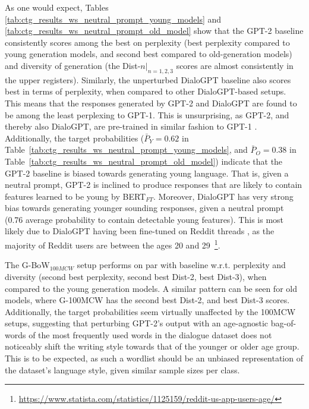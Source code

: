As one would expect, Tables \ref{tab:ctg_results_ws_neutral_prompt_young_models} and \ref{tab:ctg_results_ws_neutral_prompt_old_model} show that the GPT-2 baseline consistently scores among the best on perplexity (best perplexity compared to young generation models, and second best compared to old-generation models) and diversity of generation (the Dist-$n |_{n = 1,2,3}$ scores are almost consistently in the upper registers). Similarly, the unperturbed DialoGPT baseline also scores best in terms of perplexity, when compared to other DialoGPT-based setups. This means that the responses generated by GPT-2 and DialoGPT are found to be among the least perplexing to GPT-1. This is unsurprising, as GPT-2, and thereby also DialoGPT, are pre-trained in similar fashion to GPT-1 \citep{radford2018improving, radford2019language, zhang2019dialogpt}. Additionally, the target probabilities ($\bar{P}_Y = 0.62$ in Table~\ref{tab:ctg_results_ws_neutral_prompt_young_models}, and $\bar{P}_O = 0.38$ in Table~\ref{tab:ctg_results_ws_neutral_prompt_old_model}) indicate that the GPT-2 baseline is biased towards generating young language. That is, given a neutral prompt, GPT-2 is inclined to produce responses that are likely to contain features learned to be young by BERT$_{FT}$. Moreover, DialoGPT has very strong bias towards generating younger sounding responses, given a neutral prompt (0.76 average probability to contain detectable young features). This is most likely due to DialoGPT having been fine-tuned on Reddit threads \citep{zhang2019dialogpt}, as the majority of Reddit users are between the ages 20 and 29~\footnote{\url{https://www.statista.com/statistics/1125159/reddit-us-app-users-age/}}.

The G-BoW$_{100MCW}$ setup performs on par with baseline w.r.t. perplexity and diversity (second best perplexity, second best Dist-2, best Dist-3), when compared to the young generation models. A similar pattern can be seen for old models, where G-100MCW has the second best Dist-2, and best Dist-3 scores. Additionally, the target probabilities seem virtually unaffected by the 100MCW setups, suggesting that perturbing GPT-2's output with an age-agnostic bag-of-words of the most frequently used words in the dialogue dataset does not noticeably shift the writing style towards that of the younger or older age group. This is to be expected, as such a wordlist should be an unbiased representation of the dataset's language style, given similar sample sizes per class.

